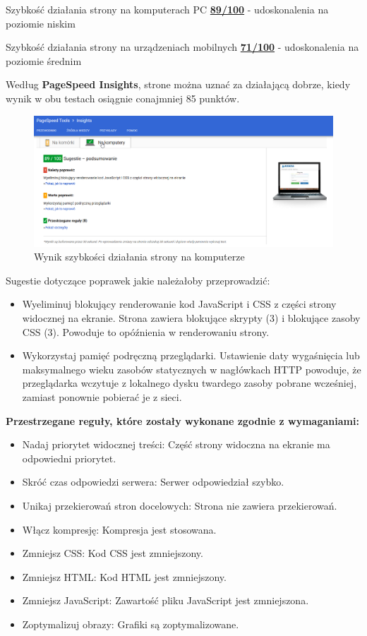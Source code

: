 \documentclass[openright]{xmgr}
\begin{document}
	Szybkość działania strony na komputerach PC \underline{\textbf{89/100}} - udoskonalenia na poziomie niskim
	
	Szybkość działania strony na urządzeniach mobilnych \underline{\textbf{71/100}} - udoskonalenia na poziomie średnim
	
	Według \textbf{PageSpeed Insights}, strone można uznać za działającą dobrze, kiedy wynik w obu testach osiągnie conajmniej 85 punktów.
	
	\begin{figure}[!tbh]
		\centering
		\includegraphics[width=\linewidth]{image/phone}
		\caption{Wynik szybkości działania strony na komputerze}
	\end{figure}
	
	Sugestie dotyczące poprawek jakie należałoby przeprowadzić:
		\begin{itemize}
			\item Wyeliminuj blokujący renderowanie kod JavaScript i CSS z części strony widocznej na ekranie. Strona zawiera blokujące skrypty (3) i blokujące zasoby CSS (3). Powoduje to opóźnienia w renderowaniu strony.
			\item Wykorzystaj pamięć podręczną przeglądarki. Ustawienie daty wygaśnięcia lub maksymalnego wieku zasobów statycznych w nagłówkach HTTP powoduje, że przeglądarka wczytuje z lokalnego dysku twardego zasoby pobrane wcześniej, zamiast ponownie pobierać je z sieci.
	\end{itemize}
	\newpage
	\textbf{Przestrzegane reguły, które zostały wykonane zgodnie z wymaganiami:}
	\begin{itemize}
		\item Nadaj priorytet widocznej treści: Część strony widoczna na ekranie ma odpowiedni priorytet.
		\item Skróć czas odpowiedzi serwera: Serwer odpowiedział szybko.
		\item Unikaj przekierowań stron docelowych: Strona nie zawiera przekierowań.
		\item Włącz kompresję: Kompresja jest stosowana.
		\item Zmniejsz CSS: Kod CSS jest zmniejszony.
		\item Zmniejsz HTML: Kod HTML jest zmniejszony.
		\item Zmniejsz JavaScript: Zawartość pliku JavaScript jest zmniejszona.
		\item Zoptymalizuj obrazy: Grafiki są zoptymalizowane. 
	\end{itemize}
	
\end{document}
